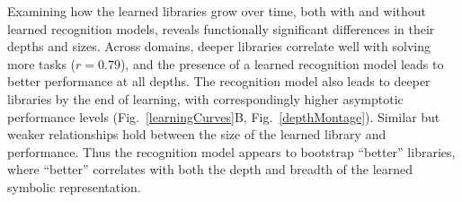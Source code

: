 \documentclass[12pt]{article}
\begin{document}
Examining how the learned libraries grow over time, both with and without learned recognition models, reveals functionally significant differences in their depths and sizes. Across domains, deeper libraries correlate well with solving more tasks ($r=0.79$), %
and the presence of a learned recognition model leads to better performance at all depths. The recognition model also leads to deeper libraries by the end of learning, with correspondingly higher asymptotic performance levels (Fig.~\ref{learningCurves}B, Fig.~\ref{depthMontage}).  Similar but weaker relationships hold between the size of the learned library and performance. 
%
Thus the recognition
model appears to bootstrap ``better'' libraries, where ``better'' correlates
with both the depth and breadth of the learned
symbolic representation. %
\end{document}
